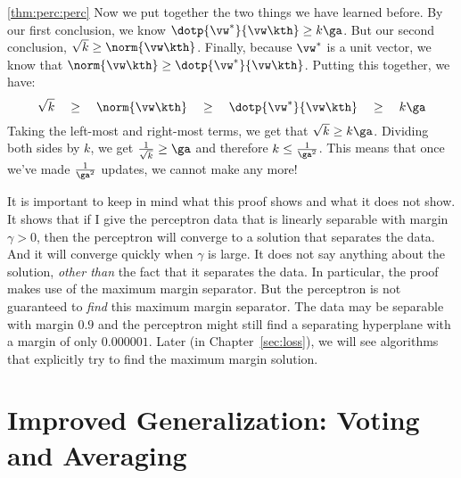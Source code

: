 \begin{myproof}{\ref{thm:perc:perc}}
  Now we put together the two things we have learned before.  By our
  first conclusion, we know $\dotp{\vw^*}{\vw\kth} \geq k \ga$.  But
  our second conclusion, $\sqrt{k} \geq \norm{\vw\kth}$.  Finally,
  because $\vw^*$ is a unit vector, we know that $\norm{\vw\kth} \geq
  \dotp{\vw^*}{\vw\kth}$.  Putting this together, we have:
  \begin{equation}
    \sqrt k
    \quad\geq\quad
    \norm{\vw\kth}
    \quad\geq\quad
    \dotp{\vw^*}{\vw\kth}
    \quad\geq\quad
    k\ga
  \end{equation}
  Taking the left-most and right-most terms, we get that $\sqrt{k}
  \geq k \ga$.  Dividing both sides by $k$, we get $\frac 1 {\sqrt{k}}
  \geq \ga$ and therefore $k \leq \frac 1 {\ga^2}$.  This means
  that once we've made $\frac 1 {\ga^2}$ updates, we cannot make
  any more!
\end{myproof}



It is important to keep in mind what this proof shows and what it does
not show.  It shows that if I give the perceptron data that is
linearly separable with margin $\gamma > 0$, then the perceptron will
converge to a solution that separates the data.  And it will converge
quickly when $\gamma$ is large.  It does not say anything about the
solution, \emph{other than} the fact that it separates the data.  In
particular, the proof makes use of the maximum margin separator.  But
the perceptron is not guaranteed to \emph{find} this maximum margin
separator.  The data may be separable with margin $0.9$ and the
perceptron might still find a separating hyperplane with a margin of
only $0.000001$.  Later (in Chapter~\ref{sec:loss}), we will see
algorithms that explicitly try to find the maximum margin solution.


\section{Improved Generalization: Voting and Averaging}


